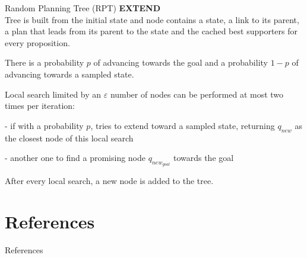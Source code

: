 \documentclass[10pt, xcolor=table]{beamer}
\begin{document}
\begin{frame}{Random Planning Tree (RPT)}
\justify
\textbf{\large\alert{EXTEND}}\\[0.3cm]
Tree is built from the initial state and node contains a state, a link to its parent, a plan that leads from its parent to the state and the cached best supporters for every proposition.

There is a probability $p$ of advancing towards the goal and a probability $1-p$ of advancing towards a sampled state.

Local search limited by an $\varepsilon$ number of nodes can be performed at most two times per iteration: 

\hspace{0.5cm}
- if with a probability $p$, tries to extend toward a sampled state, returning  $q_{new}$ as the closest node of this local search 

\hspace{0.5cm}
- another one to find a promising node $q_{new_{goal}}$ towards the goal

After every local search, a new node is added to the tree.
\end{frame}



\section{References}
\begin{frame}[allowframebreaks]{References}
  
  
\end{frame}
\end{document}
